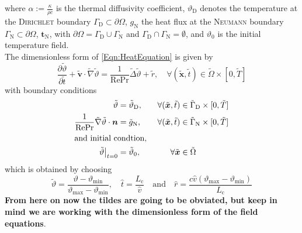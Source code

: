 \documentclass[]{scrartcl}
\newcommand{\pfrac}[2]{\frac{\partial #1}{\partial #2}}
\newcommand{\bs}[1]{\boldsymbol{#1}}
\begin{document}
where $\alpha := \tfrac{\kappa}{\rho c}$ is the thermal diffusivity coefficient, $ \vartheta_\textrm{D}$ denotes the temperature at the \textsc{Dirichlet} boundary $\Gamma_\textrm{D}\subset\partial\Omega$, $g_\textrm{N}$ the heat flux at the \textsc{Neumann} boundary $\Gamma_\textrm{N}\subset\partial\Omega$, $\bs{t}_\textrm{N}$, with $\partial \Omega = \Gamma_\textrm{D} \cup \Gamma_\textrm{N}$ and $ \Gamma_\textrm{D} \cap \Gamma_\textrm{N} = \emptyset$, and $ \vartheta_0$ is the initial temperature field. \\

The dimensionless form of \cref{Eqn:HeatEquation} is given by 
\begin{equation}\label{Eqn:DimensionlessHeatEquation}
	\pfrac{\tilde{\vartheta}}{\tilde{t}} + \bs{\tilde{v}} \cdot \tilde{\nabla} \tilde{\vartheta} = \dfrac{1}{\mathrm{Re}\mathrm{Pr}} \tilde{\Delta} \tilde{\vartheta} + \tilde{r }, \quad \forall (\bs{\tilde{x}}, \tilde{t}) \in\tilde{ \Omega }\times [0,\tilde{ T} ]
\end{equation}
with boundary conditions
\begin{alignat*}{2}
\tilde{\vartheta} &= \tilde{\vartheta}_\textrm{D}, \quad& \forall (\tilde{\bs{x}}, \tilde{t})&\in \tilde{ \Gamma}_\textrm{D} \times [0,\tilde{ T}] \\
 \dfrac{1}{\mathrm{Re}\mathrm{Pr}} \tilde{\nabla} \tilde{\vartheta} \cdot \bs{n} &= \tilde{g}_\textrm{N}, \quad& \forall (\tilde{\bs{x}}, \tilde{t})&\in \tilde{ \Gamma}_\textrm{N} \times [0, \tilde{ T} ]\\
\intertext{and initial condtion,} 
\tilde{\vartheta}\big|_{t = 0} &= \tilde{\vartheta}_0,\quad &\forall \tilde{\bs{x}}& \in \tilde{\Omega} 
\end{alignat*}
which is obtained by choosing
\begin{equation*}
	\tilde{\vartheta} = \dfrac{\vartheta-\vartheta_{\min}}{\vartheta_{\max} - \vartheta_{\min}}, \quad
	 \hat{t} = \dfrac{L_\textrm{c}}{\hat{v}} \quad \textrm{and} \quad \hat{r} = \dfrac{c\hat{v} (\vartheta_{\max} - \vartheta_{\min})}{L_\textrm{c}}
\end{equation*}
 \textbf{From here on now the tildes are going to be obviated, but keep in mind we are working with the dimensionless form of the field equations}.\\
\end{document}
